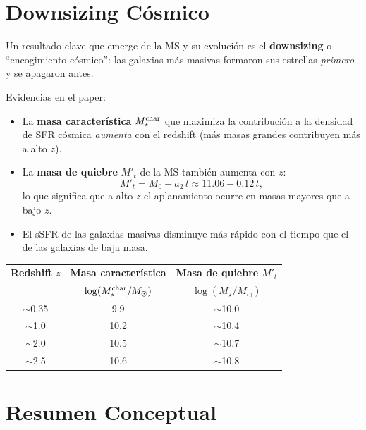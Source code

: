 \documentclass[12pt, a4paper]{article}
\begin{document}
\section{Downsizing Cósmico}

Un resultado clave que emerge de la MS y su evolución es el
\textbf{downsizing} o ``encogimiento cósmico'': las galaxias más masivas
formaron sus estrellas \textit{primero} y se apagaron antes.

Evidencias en el paper:
\begin{itemize}[leftmargin=2em]
    \item La \textbf{masa característica} $M_\star^{\rm char}$ que maximiza la
          contribución a la densidad de SFR cósmica \textit{aumenta} con el
          redshift (más masas grandes contribuyen más a alto $z$).
    \item La \textbf{masa de quiebre} $M'_t$ de la MS también aumenta con $z$:
          \begin{equation}
              M'_t = M_0 - a_2\,t \approx 11.06 - 0.12\,t,
          \end{equation}
          lo que significa que a alto $z$ el aplanamiento ocurre en masas
          mayores que a bajo $z$.
    \item El sSFR de las galaxias masivas disminuye más rápido con el tiempo
          que el de las galaxias de baja masa.
\end{itemize}

\begin{center}
\begin{tabular}{ccc}
\toprule
\textbf{Redshift} $z$ & \textbf{Masa característica} & \textbf{Masa de quiebre} $M'_t$ \\
& $\log(M_\star^{\rm char}/M_\odot)$ & $\log(M_\star/M_\odot)$ \\
\midrule
$\sim$0.35 & 9.9  & $\sim$10.0 \\
$\sim$1.0  & 10.2 & $\sim$10.4 \\
$\sim$2.0  & 10.5 & $\sim$10.7 \\
$\sim$2.5  & 10.6 & $\sim$10.8 \\
\bottomrule
\end{tabular}
\end{center}

\section{Resumen Conceptual}
\end{document}
